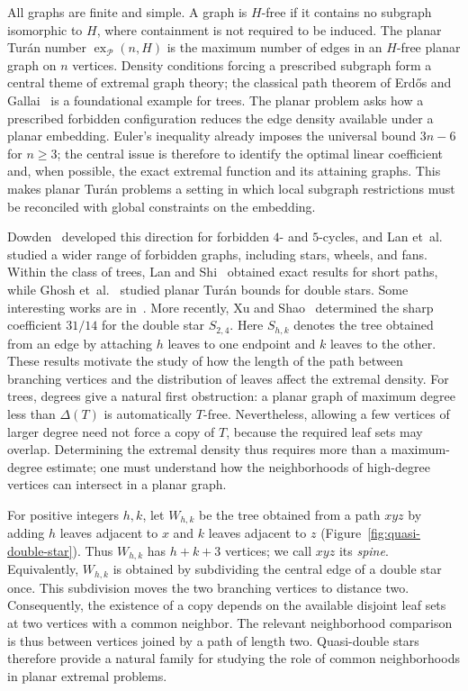 \documentclass[11pt,a4paper]{article}
\theoremstyle{remark}
\newcommand{\ex}{\operatorname{ex}}
\newcommand{\PP}{\mathcal P}
\begin{document}
All graphs are finite and simple. A graph is $H$-free if it contains no subgraph isomorphic to $H$, where containment is not required to be induced. The planar Tur\'an number $\ex_{\PP}(n,H)$ is the maximum number of edges in an $H$-free planar graph on $n$ vertices. Density conditions forcing a prescribed subgraph form a central theme of extremal graph theory; the classical path theorem of Erd\H{o}s and Gallai~\cite{ErdosGallai1959} is a foundational example for trees. The planar problem asks how a prescribed forbidden configuration reduces the edge density available under a planar embedding. Euler's inequality already imposes the universal bound $3n-6$ for $n\ge3$; the central issue is therefore to identify the optimal linear coefficient and, when possible, the exact extremal function and its attaining graphs. This makes planar Tur\'an problems a setting in which local subgraph restrictions must be reconciled with global constraints on the embedding.

Dowden~\cite{Dowden2016} developed this direction for forbidden $4$- and $5$-cycles, and Lan et~al.~\cite{LanShiSong2019} studied a wider range of forbidden graphs, including stars, wheels, and fans. Within the class of trees, Lan and Shi~\cite{LanShi2019} obtained exact results for short paths, while Ghosh et~al.~\cite{GhoshEtAl2022} studied planar Tur\'an bounds for double stars. Some interesting works are in~\cite{b1,b2,b3,b4,b5}. More recently, Xu and Shao~\cite{XuShao2025} determined the sharp coefficient $31/14$ for the double star $S_{2,4}$. Here $S_{h,k}$ denotes the tree obtained from an edge by attaching $h$ leaves to one endpoint and $k$ leaves to the other. These results motivate the study of how the length of the path between branching vertices and the distribution of leaves affect the extremal density.
For trees, degrees give a natural first obstruction: a planar graph of maximum degree less than $\Delta(T)$ is automatically $T$-free. Nevertheless, allowing a few vertices of larger degree need not force a copy of $T$, because the required leaf sets may overlap. Determining the extremal density thus requires more than a maximum-degree estimate; one must understand how the neighborhoods of high-degree vertices can intersect in a planar graph.

For positive integers $h,k$, let $W_{h,k}$ be the tree obtained from a path $xyz$ by adding $h$ leaves adjacent to $x$ and $k$ leaves adjacent to $z$ (Figure~\ref{fig:quasi-double-star}). Thus $W_{h,k}$ has $h+k+3$ vertices; we call $xyz$ its \emph{spine}. Equivalently, $W_{h,k}$ is obtained by subdividing the central edge of a double star once. This subdivision moves the two branching vertices to distance two. Consequently, the existence of a copy depends on the available disjoint leaf sets at two vertices with a common neighbor. The relevant neighborhood comparison is thus between vertices joined by a path of length two. Quasi-double stars therefore provide a natural family for studying the role of common neighborhoods in planar extremal problems.
\end{document}
